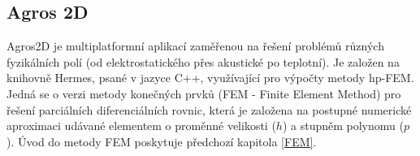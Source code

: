 \documentclass[12pt,a4paper,oneside]{article}
\numberwithin{equation}{section} %
\numberwithin{figure}{section} %
\numberwithin{table}{section} %
\begin{document}
%
%



\subsection{Agros 2D}
Agros2D je multiplatformní aplikací zaměřenou na řešení problémů různých fyzikálních polí (od elektrostatického přes akustické po teplotní). Je založen na knihovně Hermes, psané v jazyce C++, využívající pro výpočty metody hp-FEM. Jedná se o verzi metody konečných prvků (FEM - Finite Element Method) pro řešení parciálních diferenciálních rovnic, která je založena na postupné numerické aproximaci udávané elementem o proměnné velikosti ($h$) a stupněm polynomu ($p$). Úvod do metody FEM poskytuje předchozí kapitola \ref{FEM}. \cite{hpFEM}
\end{document}
